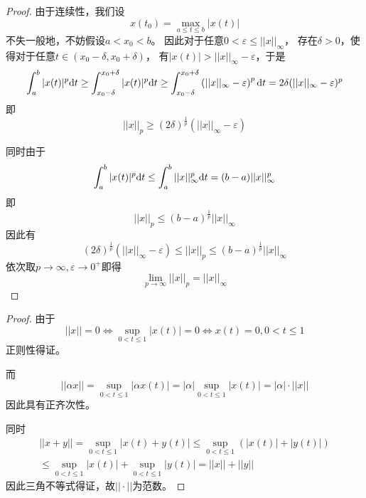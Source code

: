 \documentclass[cn]{homework}
\begin{document}
    \problem
    \begin{proof}
        由于连续性，我们设
        \[x(t_0)=\max_{a\leq t\leq b}|x(t)|\]
        不失一般地，不妨假设$a<x_0<b$。
        因此对于任意$0<\varepsilon\leq||x||_\infty$，
        存在$\delta>0$，使得对于任意$t\in(x_0-\delta,x_0+\delta)$，
        有$|x(t)|>||x||_\infty-\varepsilon$，于是
        \[\int_a^b|x(t)|^p\mathrm d t
        \geq\int_{x_0-\delta}^{x_0+\delta}|x(t)|^p\mathrm d t
        \geq\int_{x_0-\delta}^{x_0+\delta}
        \left(||x||_\infty-\varepsilon\right)^p\mathrm d t
        =2\delta(||x||_\infty-\varepsilon)^p\]
        即
        \[||x||_p\geq(2\delta)^\frac{1}{p}(||x||_\infty-\varepsilon)\]
        
        同时由于
        \[\int_a^b|x(t)|^p\mathrm d t\leq\int_a^b||x||_\infty^p\mathrm d t
        =(b-a)||x||_\infty^p\]
        即
        \[||x||_p\leq(b-a)^\frac{1}{p}||x||_\infty\]
        因此有
        \[(2\delta)^\frac{1}{p}(||x||_\infty-\varepsilon)
        \leq||x||_p\leq(b-a)^\frac{1}{p}||x||_\infty\]
        依次取$p\to\infty,\varepsilon\to0^+$即得
        \[\lim_{p\to\infty}||x||_p=||x||_\infty\]
    \end{proof}

    \problem
    \begin{subproblem}[(\arabic*)]
        \item
        \begin{proof}
            由于
            \[||x||=0\Leftrightarrow\sup_{0<t\leq 1}|x(t)|=0
            \Leftrightarrow x(t)=0,0<t\leq 1\]
            正则性得证。

            而
            \[||\alpha x||=\sup_{0<t\leq 1}|\alpha x(t)|
            =|\alpha|\sup_{0<t\leq 1}|x(t)|=|\alpha|\cdot||x||\]
            因此具有正齐次性。

            同时
            \begin{multline*}
                ||x+y||=\sup_{0<t\leq 1}|x(t)+y(t)|
                \leq\sup_{0<t\leq 1}(|x(t)|+|y(t)|)\\
                \leq\sup_{0<t\leq 1}|x(t)|+\sup_{0<t\leq 1}|y(t)|
                =||x||+||y||
            \end{multline*}
            因此三角不等式得证，故$||\cdot||$为范数。
        \end{proof}
    \end{subproblem}
\end{document}
